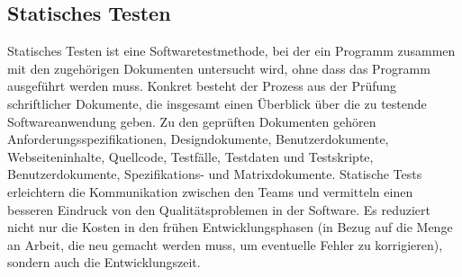 \subsection{Statisches Testen}

Statisches Testen ist eine Softwaretestmethode,
bei der ein Programm zusammen mit den zugehörigen
Dokumenten untersucht wird, ohne dass das Programm
ausgeführt werden muss. Konkret besteht der Prozess aus
der Prüfung schriftlicher Dokumente, die insgesamt
einen Überblick über die zu testende Softwareanwendung
geben. Zu den geprüften Dokumenten gehören
Anforderungsspezifikationen, Designdokumente,
Benutzerdokumente, Webseiteninhalte, Quellcode,
Testfälle, Testdaten und Testskripte,
Benutzerdokumente, Spezifikations- und
Matrixdokumente. Statische Tests erleichtern die
Kommunikation zwischen den Teams und vermitteln
einen besseren Eindruck von den Qualitätsproblemen
in der Software. Es reduziert nicht nur die Kosten
in den frühen Entwicklungsphasen (in Bezug auf die
Menge an Arbeit, die neu gemacht werden muss, um
eventuelle Fehler zu korrigieren), sondern auch die
Entwicklungszeit.
